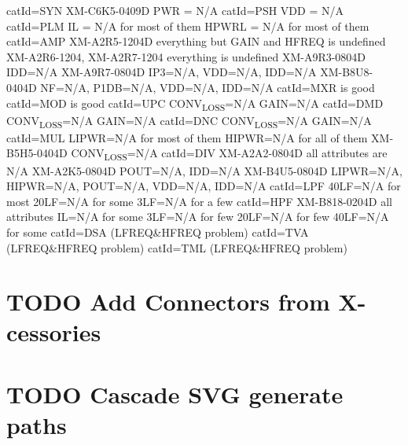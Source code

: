 \documentclass[11pt]{article}
\begin{document}
catId=SYN
  XM-C6K5-0409D PWR = N/A
catId=PSH
  VDD = N/A
catId=PLM
  IL = N/A for most of them
  HPWRL = N/A for most of them
catId=AMP
  XM-A2R5-1204D
    everything but GAIN and HFREQ is undefined
  XM-A2R6-1204, XM-A2R7-1204
    everything is undefined
  XM-A9R3-0804D
    IDD=N/A
  XM-A9R7-0804D
    IP3=N/A, VDD=N/A, IDD=N/A
  XM-B8U8-0404D
    NF=N/A, P1DB=N/A, VDD=N/A, IDD=N/A
catId=MXR is good
catId=MOD is good
catId=UPC
  CONV\textsubscript{LOSS}=N/A
  GAIN=N/A
catId=DMD
  CONV\textsubscript{LOSS}=N/A
  GAIN=N/A
catId=DNC
  CONV\textsubscript{LOSS}=N/A
  GAIN=N/A
catId=MUL
  LIPWR=N/A for most of them
  HIPWR=N/A for all of them
  XM-B5H5-0404D CONV\textsubscript{LOSS}=N/A
catId=DIV
  XM-A2A2-0804D all attributes are N/A
  XM-A2K5-0804D POUT=N/A, IDD=N/A
  XM-B4U5-0804D LIPWR=N/A, HIPWR=N/A, POUT=N/A, VDD=N/A, IDD=N/A
catId=LPF
  40LF=N/A for most
  20LF=N/A for some
  3LF=N/A for a few
catId=HPF
  XM-B818-0204D all attributes
  IL=N/A for some
  3LF=N/A for few
  20LF=N/A for few
  40LF=N/A for some
catId=DSA (LFREQ\&HFREQ problem)
catId=TVA (LFREQ\&HFREQ problem)
catId=TML (LFREQ\&HFREQ problem)
\section{{\bfseries\sffamily TODO}  Add Connectors from X-cessories}
\label{sec:org52e52a6}
\section{{\bfseries\sffamily TODO}  Cascade SVG generate paths}
\label{sec:orga611e3f}
\end{document}
